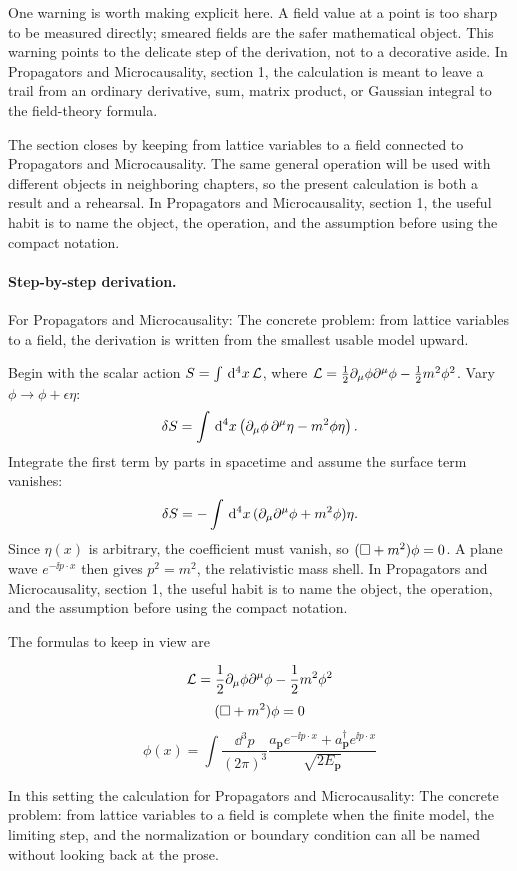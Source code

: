 One warning is worth making explicit here.  A field value at a point is too sharp to be measured directly; smeared fields are the safer mathematical object.  This warning points to the delicate step of the derivation, not to a decorative aside.  In Propagators and Microcausality, section 1, the calculation is meant to leave a trail from an ordinary derivative, sum, matrix product, or Gaussian integral to the field-theory formula.

The section closes by keeping from lattice variables to a field connected to Propagators and Microcausality.  The same general operation will be used with different objects in neighboring chapters, so the present calculation is both a result and a rehearsal.  In Propagators and Microcausality, section 1, the useful habit is to name the object, the operation, and the assumption before using the compact notation.



\paragraph{Step-by-step derivation.}

For Propagators and Microcausality: The concrete problem: from lattice variables to a field, the derivation is written from the smallest usable model upward.

Begin with the scalar action \(S=\int\,\mathrm d^4x\,\mathcal L\), where \(\mathcal L=\frac12\partial_\mu\phi\partial^\mu\phi-\frac12m^2\phi^2\).  Vary \(\phi\to\phi+\epsilon\eta\):
\[
  \delta S=\int\,\mathrm d^4x\left(\partial_\mu\phi\,\partial^\mu\eta-m^2\phi\eta\right).
\]
Integrate the first term by parts in spacetime and assume the surface term vanishes:
\[
  \delta S=-\int\,\mathrm d^4x\,(\partial_\mu\partial^\mu\phi+m^2\phi)\eta.
\]
Since \(\eta(x)\) is arbitrary, the coefficient must vanish, so \((\Box+m^2)\phi=0\).  A plane wave \(e^{-\ii p\cdot x}\) then gives \(p^2=m^2\), the relativistic mass shell.  In Propagators and Microcausality, section 1, the useful habit is to name the object, the operation, and the assumption before using the compact notation.

The formulas to keep in view are

\[
  \mathcal L=\frac12\partial_\mu\phi\partial^\mu\phi-\frac12m^2\phi^2
\]
\[
  (\Box+m^2)\phi=0
\]
\[
  \phi(x)=\int\frac{\dd^3p}{(2\pi)^3}\frac{a_{\bm p}e^{-\ii p\cdot x}+a_{\bm p}^\dagger e^{\ii p\cdot x}}{\sqrt{2E_{\bm p}}}
\]

In this setting the calculation for Propagators and Microcausality: The concrete problem: from lattice variables to a field is complete when the finite model, the limiting step, and the normalization or boundary condition can all be named without looking back at the prose.




